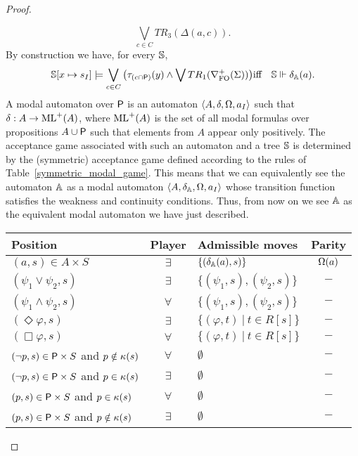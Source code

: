 \begin{proof}
\begin{pfclaim}
 \[
 \bigvee_{c \in C} TR_3(\Delta(a,c)).
 \]
By construction we have, for every $\mathbb{S}$,
%
    \begin{eqnarray*}
    \model[x\mapsto s_I] \models \bigvee_{c \in C} \big (\tau_{(c \cap \prop)}(y) \land \bigvee TR_1(\posdbnfofo{\Sigma})\big) & \text{iff} &\model \mmodels \delta_\aut(a).
    \end{eqnarray*}
%
A modal automaton over $\mathsf{P}$ is an automaton $ \langle{A, \delta, \Omega, a_I}\rangle$ such that $\delta : A \to \mathrm{ML}^+ (A)$, where $\mathrm{ML}^+ (A)$ is the set of all modal formulas over propositions $A \cup \mathsf{P}$ such that elements from $A$ appear only positively.
The acceptance game associated with such an automaton and a tree $\mathbb{S}$ is determined by the (symmetric) acceptance game defined according to the rules of Table~\ref{symmetric_modal_game}.
This means that we can equivalently see the automaton $\mathbb{A}$ as a modal automaton $\langle{A, \delta_\ensuremath\mathbb{A}, \Omega, a_I}\rangle$ whose transition function satisfies the weakness and continuity conditions. Thus, from now on we see $\mathbb{A}$ as the equivalent modal automaton we have just described.%

\begin{table}[h]
  \centering
\begin{tabular}{|l|c|l|c|}
 \hline
  Position & Player & Admissible moves & Parity\\
   \hline
  $(a,s) \in A \times S$ & $\exists$ & $\{(\delta_\mathbb{A}(a),s)\}$ & $\Omega(a)$\\
  $(\psi_1 \vee \psi_2,s)$ & $\exists$ & $\{(\psi_1,s),(\psi_2,s) \}$ & $-$ \\
  $(\psi_1 \wedge \psi_2,s)$ & $\forall$ & $\{(\psi_1,s),(\psi_2,s) \}$ & $-$ \\
  $(\Diamond\varphi,s)$ & $\exists$ & $\{(\varphi,t)\ |\ t \in R[s] \}$ & $-$ \\
  $(\Box\varphi,s)$ & $\forall$ & $\{(\varphi,t)\ |\ t \in R[s] \}$ & $-$ \\
  $(\lnot p,s) \in \mathsf{P} \times S$ and $p \notin \kappa(s)$ & $\forall$ & $\emptyset$ & $-$\\
  $(\lnot p,s) \in \mathsf{P} \times S$ and $p \in \kappa(s)$ & $\exists$ & $\emptyset$ & $-$\\
  $(p,s) \in \mathsf{P} \times S$ and $p \in \kappa(s)$ & $\forall$ & $\emptyset$ & $-$\\
  $(p,s) \in \mathsf{P} \times S$ and $p \notin \kappa(s)$ & $\exists$ & $\emptyset$ & $-$\\


\end{tabular}
\end{table}
\end{pfclaim}
\end{proof}
